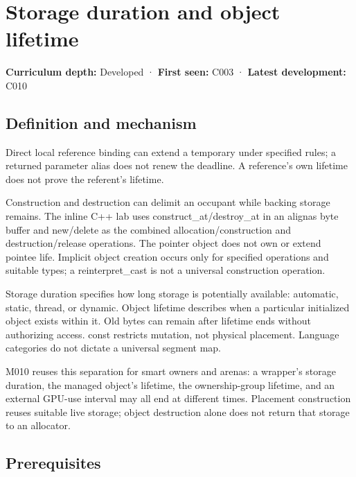 \hypertarget{appendix-0b104bcba06b}{}\label{referencestart:appendix-0b104bcba06b}
\section{Storage duration and object lifetime}\label{appendix-0b104bcba06b-storage-duration-and-object-lifetime}

\textbf{Curriculum depth:} Developed · \textbf{First seen:} C003 · \textbf{Latest development:} C010

\subsection{Definition and mechanism}\label{appendix-0b104bcba06b-definition-and-mechanism}

Direct local reference binding can extend a temporary under specified rules; a returned parameter alias does not renew the deadline. A reference's own lifetime does not prove the referent's lifetime.

Construction and destruction can delimit an occupant while backing storage remains. The inline C++ lab uses construct\_at/destroy\_at in an alignas byte buffer and new/delete as the combined allocation/construction and destruction/release operations. The pointer object does not own or extend pointee life. Implicit object creation occurs only for specified operations and suitable types; a reinterpret\_cast is not a universal construction operation.

Storage duration specifies how long storage is potentially available: automatic, static, thread, or dynamic. Object lifetime describes when a particular initialized object exists within it. Old bytes can remain after lifetime ends without authorizing access. const restricts mutation, not physical placement. Language categories do not dictate a universal segment map.

M010 reuses this separation for smart owners and arenas: a wrapper's storage duration, the managed object's lifetime, the ownership-group lifetime, and an external GPU-use interval may all end at different times. Placement construction reuses suitable live storage; object destruction alone does not return that storage to an allocator.

\subsection{Prerequisites}\label{appendix-0b104bcba06b-prerequisites}

